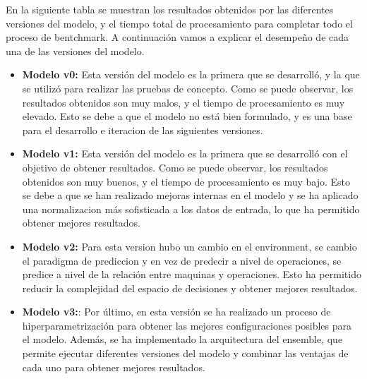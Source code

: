 En la siguiente tabla se muestran los resultados obtenidos por las
diferentes versiones del modelo, y el tiempo total de procesamiento
para completar todo el proceso de bentchmark. A continuación vamos a
explicar el desempeño de cada una de las versiones del modelo.
\begin{itemize}
    \item \textbf{Modelo v0:} Esta versión del modelo es la primera que se
        desarrolló, y la que se utilizó para realizar las pruebas de
        concepto. Como se puede observar, los resultados obtenidos son
        muy malos, y el tiempo de procesamiento es muy elevado. Esto
        se debe a que el modelo no está bien formulado, y es una base
        para el desarrollo e iteracion de las siguientes versiones.
    \item \textbf{Modelo v1:} Esta versión del modelo es la primera que
        se desarrolló con el objetivo de obtener resultados. Como se
        puede observar, los resultados obtenidos son muy buenos, y el
        tiempo de procesamiento es muy bajo. Esto se debe a que se han
        realizado mejoras internas en el modelo y se ha aplicado una
        normalizacion más sofisticada a los datos de entrada, lo que
        ha permitido obtener mejores resultados.
    \item \textbf{Modelo v2:} Para esta version hubo un cambio en el
        environment, se cambio el paradigma de prediccion y en vez
        de predecir a nivel de operaciones, se predice a nivel de
        la relación entre maquinas y operaciones. Esto ha permitido
        reducir la complejidad del espacio de decisiones y obtener
        mejores resultados.
    \item \textbf{Modelo v3:}: Por último, en esta versión se ha
        realizado un proceso de hiperparametrización para obtener
        las mejores configuraciones posibles para el modelo. Además,
        se ha implementado la arquitectura del ensemble, que permite
        ejecutar diferentes versiones del modelo y combinar las
        ventajas de cada uno para obtener mejores resultados.
\end{itemize}


